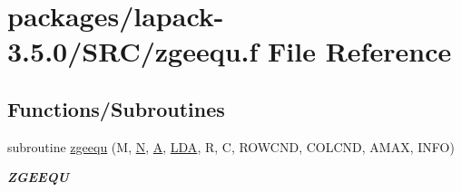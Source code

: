 \hypertarget{zgeequ_8f}{}\section{packages/lapack-\/3.5.0/\+S\+R\+C/zgeequ.f File Reference}
\label{zgeequ_8f}
\subsection*{Functions/\+Subroutines}
\begin{DoxyCompactItemize}
\item 
subroutine \hyperlink{group__complex16GEcomputational_ga6f32d90ac16974bf09e92b049b35c0c7}{zgeequ} (M, \hyperlink{polmisc_8c_a0240ac851181b84ac374872dc5434ee4}{N}, \hyperlink{classA}{A}, \hyperlink{example__user_8c_ae946da542ce0db94dced19b2ecefd1aa}{L\+D\+A}, R, C, R\+O\+W\+C\+N\+D, C\+O\+L\+C\+N\+D, A\+M\+A\+X, I\+N\+F\+O)
\begin{DoxyCompactList}\small\item\em {\bfseries Z\+G\+E\+E\+Q\+U} \end{DoxyCompactList}\end{DoxyCompactItemize}

